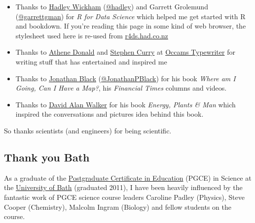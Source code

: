 \documentclass[
]{book}
\begin{document}
\begin{itemize}
\item
  Thanks to \href{https://en.wikipedia.org/wiki/Hadley_Wickham}{Hadley Wickham} (\href{https://github.com/hadley}{@hadley}) and Garrett Grolemund (\href{https://github.com/garrettgman}{@garrettgman}) for \emph{R for Data Science} \citep{r4ds} which helped me get started with R and bookdown. If you're reading this page in some kind of web browser, the stylesheet used here is re-used from \href{https://r4ds.had.co.nz/}{r4ds.had.co.nz}
\item
  Thanks to \href{https://en.wikipedia.org/wiki/Athene_Donald}{Athene Donald} and \href{https://occamstypewriter.org/scurry/}{Stephen Curry} at \href{http://occamstypewriter.org/athenedonald/}{Occams Typewriter} for writing stuff that has entertained and inspired me
\item
  Thanks to \href{https://www.new.ox.ac.uk/node/1003}{Jonathan Black} (\href{https://twitter.com/JonathanPBlack}{@JonathanPBlack}) for his book \emph{Where am I Going, Can I Have a Map?}, his \emph{Financial Times} columns and videos. \citep{jonathanblack, ft}
\item
  Thanks to \href{https://en.wikipedia.org/wiki/David_Alan_Walker}{David Alan Walker} for his book \emph{Energy, Plants \& Man} which inspired the conversations and pictures idea behind this book. \citep{epm}
\end{itemize}

So thanks scientists (and engineers) for being scientific. 🙏

\hypertarget{bath}{%
\subsection{Thank you Bath}\label{bath}}

As a graduate of the \href{https://en.wikipedia.org/wiki/Postgraduate_Certificate_in_Education}{Postgraduate Certificate in Education} (PGCE) in Science at the \href{https://en.wikipedia.org/wiki/University_of_Bath}{University of Bath} (graduated 2011), I have been heavily influenced by the fantastic work of PGCE science course leaders Caroline Padley (Physics), Steve Cooper (Chemistry), Malcolm Ingram (Biology) and fellow students on the course.
\end{document}
